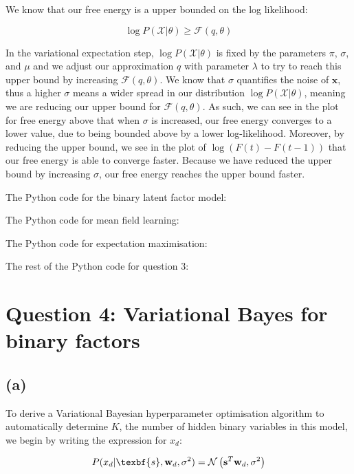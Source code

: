 \documentclass[12pt]{article}
\begin{document}
We know that our free energy is a upper bounded on the log likelihood:

\[\log P(\mathcal{X} | \theta) \geq \mathcal{F}(q, \theta)\]

In the variational expectation step, $\log P(\mathcal{X} | \theta)$ is fixed by the parameters $\pi$, $\sigma$, and $\mu$ and we adjust our approximation $q$ with parameter $\lambda$ to try to reach this upper bound by increasing $\mathcal{F}(q, \theta)$. We know that $\sigma$ quantifies the noise of $\textbf{x}$, thus a higher $\sigma$ means a wider spread in our distribution $\log P(\mathcal{X} | \theta)$, meaning we are reducing our upper bound for $\mathcal{F}(q, \theta)$. As such, we can see in the plot for free energy above that when $\sigma$ is increased, our free energy converges to a lower value, due to being bounded above by a lower log-likelihood. Moreover, by reducing the upper bound, we see in the plot of $\log(F(t)-F(t-1))$ that our free energy is able to converge faster. Because we have reduced the upper bound by increasing $\sigma$, our free energy reaches the upper bound faster.

\newpage
The Python code for the binary latent factor model:


\newpage
The Python code for mean field learning:


\newpage
The Python code for expectation maximisation:



\newpage
The rest of the Python code for question 3:

\newpage
\section*{Question 4: Variational Bayes for binary factors}
\subsection*{(a)}

To derive a Variational Bayesian hyperparameter optimisation algorithm to automatically determine $K$, the number of hidden binary variables in this model, we begin by writing the expression for $x_d$:

\[P(x_d | \texbf{s}, \textbf{w}_d, \sigma^2) = \mathcal{N}\left(\textbf{s}^T\textbf{w}_d, \sigma^2\right)\]
\end{document}
